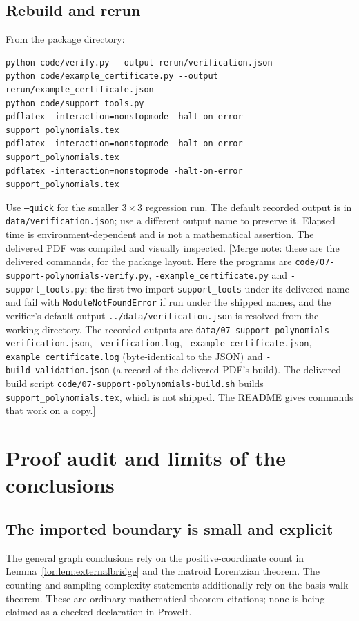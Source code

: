 \documentclass[11pt]{article}
\numberwithin{equation}{section}
\theoremstyle{definition}
\begin{document}
\subsection{Rebuild and rerun}
From the package directory:
\begin{verbatim}
python code/verify.py --output rerun/verification.json
python code/example_certificate.py --output rerun/example_certificate.json
python code/support_tools.py
pdflatex -interaction=nonstopmode -halt-on-error support_polynomials.tex
pdflatex -interaction=nonstopmode -halt-on-error support_polynomials.tex
pdflatex -interaction=nonstopmode -halt-on-error support_polynomials.tex
\end{verbatim}
Use \texttt{--quick} for the smaller $3\times3$ regression run. The default
recorded output is in \texttt{data/verification.json}; use a different output
name to preserve it. Elapsed time is environment-dependent and is not a
mathematical assertion. The delivered PDF was compiled and visually inspected.
[Merge note: these are the delivered commands, for the package layout. Here
the programs are \nolinkurl{code/07-support-polynomials-verify.py},
\nolinkurl{-example_certificate.py} and \nolinkurl{-support_tools.py}; the first
two import \texttt{support\_tools} under its delivered name and fail with
\texttt{ModuleNotFoundError} if run under the shipped names, and the
verifier's default output \texttt{../data/verification.json} is resolved
from the working directory. The recorded outputs are
\nolinkurl{data/07-support-polynomials-verification.json},
\nolinkurl{-verification.log}, \nolinkurl{-example_certificate.json},
\nolinkurl{-example_certificate.log} (byte-identical to the JSON) and
\nolinkurl{-build_validation.json} (a record of the delivered PDF's build).
The delivered build script \nolinkurl{code/07-support-polynomials-build.sh}
builds \texttt{support\_polynomials.tex}, which is not shipped. The README
gives commands that work on a copy.]

\section{Proof audit and limits of the conclusions}
\label{lor:sec:audit}
\subsection{The imported boundary is small and explicit}
The general graph conclusions rely on the positive-coordinate count in
Lemma~\ref{lor:lem:externalbridge} and the matroid Lorentzian theorem. The
counting and sampling complexity statements additionally rely on the
basis-walk theorem. These are ordinary mathematical theorem citations;
none is being claimed as a checked declaration in ProveIt.
\end{document}
